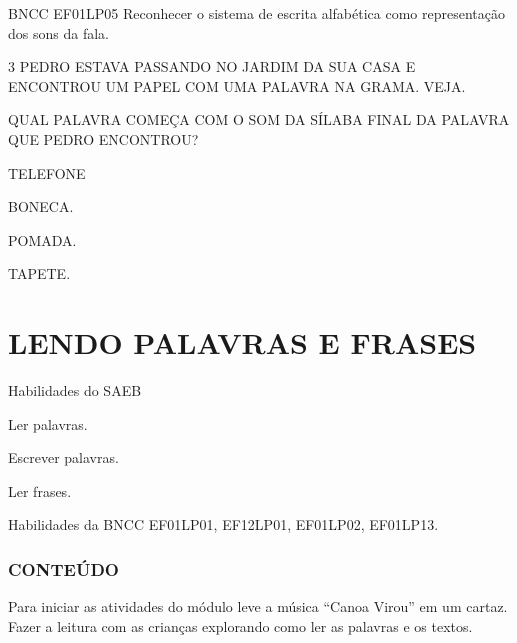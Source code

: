 \begin{escola}
{BNCC EF01LP05 Reconhecer o sistema de escrita alfabética como
representação dos sons da fala.}



\num{3} PEDRO ESTAVA PASSANDO NO JARDIM DA SUA CASA E ENCONTROU UM PAPEL COM UMA
PALAVRA NA GRAMA. VEJA.



QUAL PALAVRA COMEÇA COM O SOM DA SÍLABA FINAL DA PALAVRA QUE PEDRO ENCONTROU?

\begin{escolha}
\item TELEFONE

\item BONECA.

\item POMADA.

\item TAPETE.
\end{escolha}


\chapter{LENDO PALAVRAS E FRASES}

Habilidades do SAEB

\protect\hypertarget{_heading=h.3dy6vkm}{}{}Ler palavras.

Escrever palavras.

Ler frases.

Habilidades da BNCC 
EF01LP01, EF12LP01, EF01LP02, EF01LP13.

\subsection{CONTEÚDO}\label{conteuxfado-1}

\protect\hypertarget{_heading=h.4d34og8}{}{}Para iniciar as atividades
do módulo leve a música “Canoa Virou” em um cartaz. Fazer a leitura com as
crianças explorando como ler as palavras e os textos. 


\end{escola}
